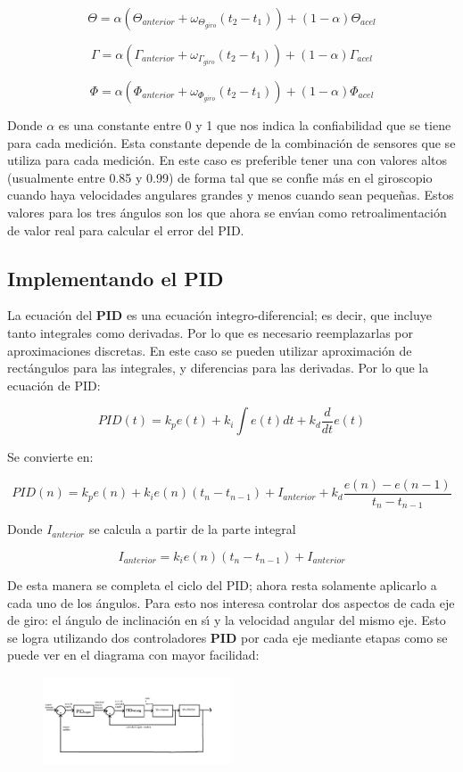 \documentclass[journal]{IEEEtran}
\begin{document}
\[\Theta =\alpha (\Theta_{anterior}+\omega_{\Theta_{giro}} (t_2-t_1))+(1-\alpha)\Theta_{acel}\]

\[\Gamma =\alpha (\Gamma_{anterior}+\omega_{\Gamma_{giro}} (t_2-t_1))+(1-\alpha)\Gamma_{acel}\]

\[\Phi =\alpha (\Phi_{anterior}+\omega_{\Phi_{giro}} (t_2-t_1))+(1-\alpha)\Phi_{acel}\]

Donde $\alpha$ es una constante entre 0 y 1 que nos indica la confiabilidad que se tiene para cada medici\'on. Esta constante depende de la combinaci\'on de sensores que se utiliza para cada medici\'on. En este caso es preferible tener una  con valores altos (usualmente entre 0.85 y 0.99) de forma tal que se conf{\'\i}e m\'as en el giroscopio cuando haya velocidades angulares grandes y menos cuando sean peque\~nas.
Estos valores para los tres \'angulos son los que ahora se env{\'\i}an como retroalimentaci\'on de valor real para calcular el error del PID.

\subsection{Implementando el PID}
La ecuaci\'on del \textbf{PID} es una ecuaci\'on integro-diferencial; es decir, que incluye tanto integrales como derivadas. Por lo que es necesario reemplazarlas por aproximaciones discretas. En este caso se pueden utilizar aproximaci\'on de rect\'angulos para las integrales, y diferencias para las derivadas. Por lo que la ecuaci\'on de PID:


\[PID(t)=k_p e(t) + k_i \int e(t) dt + k_d \frac{d}{dt} e(t)\]

Se convierte en:


\[PID(n)=k_p e(n) + k_i e(n) (t_n-t_{n-1})+I_{anterior} + k_d \frac{e(n)-e(n-1)}{t_n-t_{n-1}} \]

Donde $I_{anterior}$ se calcula a partir de la parte integral

\[I_{anterior}=k_i e(n) (t_n-t_{n-1})+I_{anterior}\]

De esta manera se completa el ciclo del PID; ahora resta solamente aplicarlo a cada uno de los \'angulos. Para esto nos interesa controlar dos aspectos de cada eje de giro: el \'angulo de inclinaci\'on en s{\'\i} y  la velocidad angular del mismo eje. Esto se logra utilizando dos controladores \textbf{PID}  por cada eje mediante etapas como se puede ver en el diagrama con mayor facilidad:

\begin{figure}[h]
\includegraphics[width=0.5\textwidth]
{PID_explicacion_Completa}
\end{figure}
\end{document}
